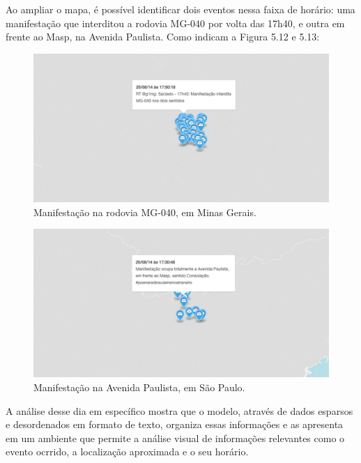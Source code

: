 Ao ampliar o mapa, é possível identificar dois eventos nessa faixa de horário: uma manifestação que interditou a rodovia MG-040 por volta das 17h40, e outra em frente ao Masp, na Avenida Paulista. Como indicam a Figura 5.12 e 5.13:

\begin{figure}[h!]
  \begin{center}
  \includegraphics[width=1.0\textwidth]{figuras/mapa-marcador-5.pdf}
  \caption{Manifestação na rodovia MG-040, em Minas Gerais.}
  \end{center}
\end{figure}

\begin{figure}[h!]
  \begin{center}
  \includegraphics[width=1.0\textwidth]{figuras/mapa-marcador-7.pdf}
  \caption{Manifestação na Avenida Paulista, em São Paulo.}
  \end{center}
\end{figure}

A análise desse dia em específico mostra que o modelo, através de dados esparsos e desordenados em formato de texto, organiza essas informações e as apresenta em um ambiente que permite a análise visual de informações relevantes como o evento ocrrido, a localização aproximada e o seu horário.

